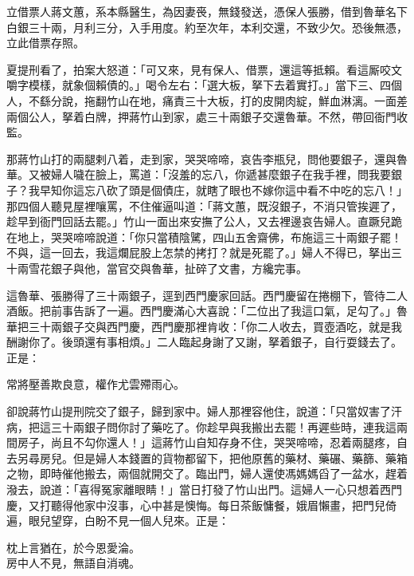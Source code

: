 \begin{myquote}[\markfont]
立借票人蔣文蕙，系本縣醫生，為因妻䘮，無錢發送，憑保人張勝，借到魯華名下白銀三十兩，月利三分，入手用度。約至次年，本利交還，不致少欠。恐後無憑，立此借票存照。
\end{myquote}

夏提刑看了，拍案大怒道：「可又來，見有保人、借票，還這等抵賴。看這厮咬文嚼字模樣，就象個賴債的。」{}喝令左右：「選大板，拏下去着實打。」當下三、四個人，不繇分說，拖翻竹山在地，痛責三十大板，打的皮開肉綻，鮮血淋漓。一面差兩個公人，拏着白牌，押蔣竹山到家，處三十兩銀子交還魯華。不然，帶回衙門收監。

那蔣竹山打的兩腿剌八着，走到家，哭哭啼啼，哀告李瓶兒，問他要銀子，還與魯華。又被婦人噦在臉上，罵道：「沒羞的忘八，你遞甚麼銀子在我手裡，問我要銀子？我早知你這忘八砍了頭是個債庄，就瞎了眼也不嫁你這中看不中吃的忘八！」那四個人聽見屋裡嚷罵，不住催逼叫道：「蔣文蕙，既沒銀子，不消只管挨遲了，趁早到衙門回話去罷。」竹山一面出來安撫了公人，又去裡邊哀告婦人。直蹶兒跪在地上，{}哭哭啼啼說道：「你只當積陰騭，四山五舍齋佛，布施這三十兩銀子罷！不與，這一回去，我這爛屁股上怎禁的拷打？就是死罷了。」婦人不得已，拏出三十兩雪花銀子與他，{}當官交與魯華，扯碎了文書，方纔完事。

這魯華、張勝得了三十兩銀子，逕到西門慶家回話。西門慶留在捲棚下，管待二人酒飯。把前事告訴了一遍。西門慶滿心大喜說：「二位出了我這口氣，足勾了。」魯華把三十兩銀子交與西門慶，西門慶那裡肯收：「你二人收去，買壺酒吃，就是我酬謝你了。後頭還有事相煩。」二人臨起身謝了又謝，拏着銀子，自行耍錢去了。正是：

\begin{myquote} 
常將壓善欺良意，權作尤雲殢雨心。
\end{myquote} 

卻說蔣竹山提刑院交了銀子，歸到家中。婦人那裡容他住，說道：「只當奴害了汗病，把這三十兩銀子問你討了藥吃了。你趁早與我搬出去罷！再遲些時，連我這兩間房子，尚且不勾你還人！」這蔣竹山自知存身不住，{}哭哭啼啼，忍着兩腿疼，自去另尋房兒。但是婦人本錢置的貨物都留下，{}把他原舊的藥材、藥碾、藥篩、藥箱之物，即時催他搬去，兩個就開交了。臨出門，婦人還使馮媽媽舀了一盆水，趕着潑去，說道：「喜得冤家離眼睛！」當日打發了竹山出門。這婦人一心只想着西門慶，又打聽得他家中沒事，心中甚是懊悔。{}每日茶飯慵餐，娥眉懶畫，把門兒倚遍，眼兒望穿，白盼不見一個人兒來。正是：

\begin{myquote} 
枕上言猶在，於今恩愛淪。\\房中人不見，無語自消魂。
\end{myquote} 

